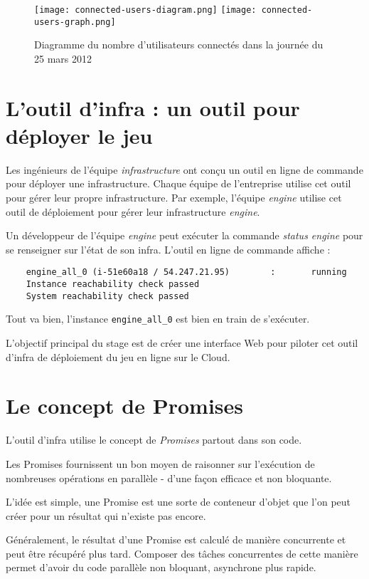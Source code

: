 \begin{figure}[H]
  \texttt{[image: connected-users-diagram.png]}
  \texttt{[image: connected-users-graph.png]}
  \caption{Diagramme du nombre d'utilisateurs connectés dans la journée du 25 mars 2012}
\end{figure}

\section{L'outil d'infra : un outil pour déployer le jeu}

Les ingénieurs de l'équipe \textit{infrastructure} ont conçu un outil en ligne
de commande pour déployer une infrastructure.
Chaque équipe de l'entreprise utilise cet outil pour gérer leur propre
infrastructure. Par exemple, l'équipe \textit{engine} utilise cet outil de
déploiement pour gérer leur infrastructure \textit{engine}.

Un développeur de l'équipe \textit{engine} peut exécuter la commande
\textit{status engine} pour se renseigner sur l'état de son infra. L'outil en
ligne de commande affiche :
\begin{verbatim}
    engine_all_0 (i-51e60a18 / 54.247.21.95)        :       running
    Instance reachability check passed
    System reachability check passed
\end{verbatim}
Tout va bien, l'instance \verb?engine_all_0? est bien en train de s'exécuter.

L'objectif principal du stage est de créer une interface Web pour piloter cet
outil d'infra de déploiement du jeu en ligne sur le Cloud.

\section{Le concept de Promises}

L'outil d'infra utilise le concept de \textit{Promises} partout dans son code.

Les Promises fournissent un bon moyen de raisonner sur l'exécution de
nombreuses opérations en parallèle - d'une façon efficace et non bloquante.

L'idée est simple, une Promise est une sorte de conteneur d'objet que
l'on peut créer pour un résultat qui n'existe pas encore.

Généralement, le résultat d'une Promise est calculé de manière
concurrente et peut être récupéré plus tard.
Composer des tâches concurrentes de cette manière permet d'avoir du code
parallèle non bloquant, asynchrone plus rapide.


